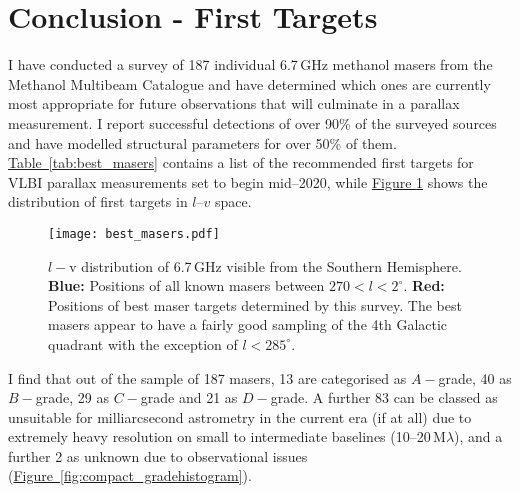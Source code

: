 	\section{Conclusion - First Targets}
        I have conducted a survey of 187 individual 6.7\,GHz methanol masers from the Methanol Multibeam Catalogue and have determined which ones are currently most appropriate for future \spirals\space observations that will culminate in a parallax measurement. I report successful detections of over 90\% of the surveyed sources and have modelled structural parameters for over 50\% of them. \hyperref[tab:best_masers]{Table~\ref*{tab:best_masers}} contains a list of the recommended first targets for VLBI parallax measurements set to begin mid--2020, while \hyperref[fig:best_masers]{Figure \ref*{fig:best_masers}} shows the distribution of first targets in $l$--$v$ space.
        \begin{figure}[h]
        \centering
        \texttt{[image: best\_masers.pdf]} 
        \caption[Best masers $l-v$ diagram ]{$l-$v distribution of 6.7\,GHz visible from the Southern Hemisphere. {\bf Blue:}  Positions of all known masers between $270<l<2^\circ$. {\bf Red:} Positions of best maser targets determined by this survey. The best masers appear to have a fairly good sampling of the 4th Galactic quadrant with the exception of $l<285^\circ$.}
        \label{fig:best_masers}
        \end{figure}
        I find that out of the sample of 187 masers, 13 are categorised as $A-$grade, 40 as $B-$grade, 29 as $C-$grade and 21 as $D-$grade. A further 83 can be classed as unsuitable for milliarcsecond astrometry in the current era (if at all) due to extremely heavy resolution on small to intermediate baselines (10--20\,M$\lambda$), and a further 2 as unknown due to observational issues (\hyperref[fig:compact_gradehistogram]{Figure~\ref*{fig:compact_gradehistogram}}).
        
        
